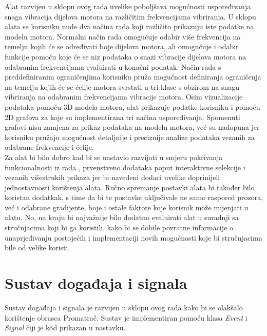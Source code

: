 \documentclass[times, utf8, diplomski]{fer}
\begin{document}
Alat razvijen u sklopu ovog rada uvelike poboljšava mogućnosti uspoređivanja snaga vibracija dijelova motora na različitim frekvencijama vibriranja. U sklopu alata se korisniku nude dva načina rada koji različito prikazuju iste podatke na modelu motora. Normalni način rada omogućuje odabir više frekvencija na temelju kojih će se određivati boje dijelova motora, ali omogućuje i odabir funkcije pomoću koje će se niz podataka o snazi vibracije dijelova motora na odabranim frekvencijama evaluirati u konačni podatak. Način rada s preddefiniranim ograničenjima korisniku pruža mogućnost definiranja ograničenja na temelju kojih će se ćelije motora svrstati u tri klase s obzirom na snagu vibriranja na odabranim frekvencijama vibracije motora. Osim vizualizacije podataka pomoću 3D modela motora, alat prikazuje podatke korisniku i pomoću 2D grafova za koje su implementirana tri načina uspoređivanja. Spomenuti grafovi nisu zamjena za prikaz podataka na modelu motora, već su nadopuna jer korisniku pružaju mogućnost detaljnije i preciznije analize podataka vezanih za odabrane frekvencije i ćelije.\\

Za alat bi bilo dobro kad bi se nastavio razvijati u smjeru pokrivanja funkcionalnosti iz rada \citep{matkovic2021getting}, prvenstveno dodataka poput interaktivne selekcije i vezanih višestrukih prikaza jer bi navedeni dodaci uvelike doprinijeli jednostavnosti korištenja alata. Ručno spremanje postavki alata bi također bilo koristan dodatkak, s time da bi te postavke uključivale ne samo raspored prozora, već i odabrane gradijente, boje i ostale faktore koje korisnik može mijenjati u alatu. No, na kraju bi najvažnije bilo dodatno evaluirati alat u suradnji sa stručnjacima koji bi ga koristili, kako bi se dobile povratne informacije o unaprjeđivanju postojećih i implementaciji novih mogućnosti koje bi stručnjacima bile od velike koristi.




\chapter{Sustav događaja i signala} \label{appendix:event-signal-system}

Sustav događaja i signala je razvijen u sklopu ovog rada kako bi se olakšalo korištenje obrasca Promatrač. Sustav je implementiran pomoću klasa \textit{Event} i  \textit{Signal} čiji je k\^{o}d prikazan u nastavku.\\
\end{document}
